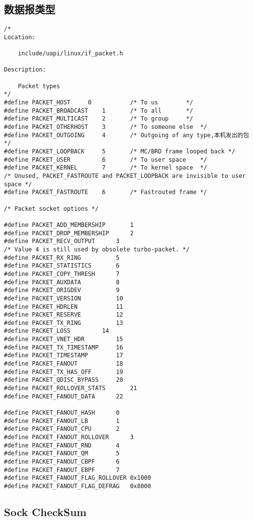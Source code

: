 		\subsection{数据报类型}
\begin{verbatim}
/* 
Location:

	include/uapi/linux/if_packet.h

Description:

	Packet types 
*/
#define PACKET_HOST		0			/* To us		*/
#define PACKET_BROADCAST	1		/* To all		*/
#define PACKET_MULTICAST	2		/* To group		*/
#define PACKET_OTHERHOST	3		/* To someone else 	*/
#define PACKET_OUTGOING		4		/* Outgoing of any type,本机发出的包 */
#define PACKET_LOOPBACK		5		/* MC/BRD frame looped back */
#define PACKET_USER			6		/* To user space	*/
#define PACKET_KERNEL		7		/* To kernel space	*/
/* Unused, PACKET_FASTROUTE and PACKET_LOOPBACK are invisible to user space */
#define PACKET_FASTROUTE	6		/* Fastrouted frame	*/

/* Packet socket options */

#define PACKET_ADD_MEMBERSHIP		1
#define PACKET_DROP_MEMBERSHIP		2
#define PACKET_RECV_OUTPUT		3
/* Value 4 is still used by obsolete turbo-packet. */
#define PACKET_RX_RING			5
#define PACKET_STATISTICS		6
#define PACKET_COPY_THRESH		7
#define PACKET_AUXDATA			8
#define PACKET_ORIGDEV			9
#define PACKET_VERSION			10
#define PACKET_HDRLEN			11
#define PACKET_RESERVE			12
#define PACKET_TX_RING			13
#define PACKET_LOSS			14
#define PACKET_VNET_HDR			15
#define PACKET_TX_TIMESTAMP		16
#define PACKET_TIMESTAMP		17
#define PACKET_FANOUT			18
#define PACKET_TX_HAS_OFF		19
#define PACKET_QDISC_BYPASS		20
#define PACKET_ROLLOVER_STATS		21
#define PACKET_FANOUT_DATA		22

#define PACKET_FANOUT_HASH		0
#define PACKET_FANOUT_LB		1
#define PACKET_FANOUT_CPU		2
#define PACKET_FANOUT_ROLLOVER		3
#define PACKET_FANOUT_RND		4
#define PACKET_FANOUT_QM		5
#define PACKET_FANOUT_CBPF		6
#define PACKET_FANOUT_EBPF		7
#define PACKET_FANOUT_FLAG_ROLLOVER	0x1000
#define PACKET_FANOUT_FLAG_DEFRAG	0x8000
\end{verbatim}	
		\subsection{Sock CheckSum}
